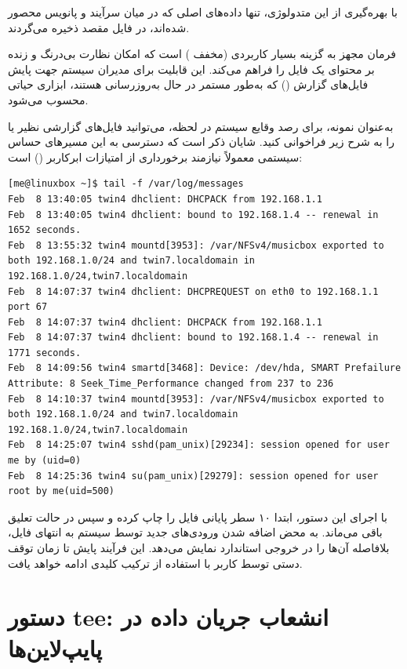 با بهره‌گیری از این متدولوژی، تنها داده‌های اصلی که در میان سرآیند و پانویس محصور شده‌اند، در فایل مقصد ذخیره می‌گردند.

فرمان  مجهز به گزینه بسیار کاربردی  (مخفف ) است که امکان نظارت بی‌درنگ و زنده بر محتوای یک فایل را فراهم می‌کند. این قابلیت برای مدیران سیستم جهت پایش فایل‌های گزارش () که به‌طور مستمر در حال به‌روزرسانی هستند، ابزاری حیاتی محسوب می‌شود.

به‌عنوان نمونه، برای رصد وقایع سیستم در لحظه، می‌توانید فایل‌های گزارشی نظیر  یا  را به شرح زیر فراخوانی کنید. شایان ذکر است که دسترسی به این مسیرهای حساس سیستمی معمولاً نیازمند برخورداری از امتیازات ابرکاربر () است:

\begin{latin}
\begin{lstlisting}
[me@linuxbox ~]$ tail -f /var/log/messages
Feb  8 13:40:05 twin4 dhclient: DHCPACK from 192.168.1.1
Feb  8 13:40:05 twin4 dhclient: bound to 192.168.1.4 -- renewal in
1652 seconds.
Feb  8 13:55:32 twin4 mountd[3953]: /var/NFSv4/musicbox exported to
both 192.168.1.0/24 and twin7.localdomain in
192.168.1.0/24,twin7.localdomain
Feb  8 14:07:37 twin4 dhclient: DHCPREQUEST on eth0 to 192.168.1.1
port 67
Feb  8 14:07:37 twin4 dhclient: DHCPACK from 192.168.1.1
Feb  8 14:07:37 twin4 dhclient: bound to 192.168.1.4 -- renewal in
1771 seconds.
Feb  8 14:09:56 twin4 smartd[3468]: Device: /dev/hda, SMART Prefailure Attribute: 8 Seek_Time_Performance changed from 237 to 236
Feb  8 14:10:37 twin4 mountd[3953]: /var/NFSv4/musicbox exported to both 192.168.1.0/24 and twin7.localdomain
192.168.1.0/24,twin7.localdomain
Feb  8 14:25:07 twin4 sshd(pam_unix)[29234]: session opened for user me by (uid=0)
Feb  8 14:25:36 twin4 su(pam_unix)[29279]: session opened for user root by me(uid=500)
\end{lstlisting}
\end{latin}

با اجرای این دستور،  ابتدا ۱۰ سطر پایانی فایل را چاپ کرده و سپس در حالت تعلیق باقی می‌ماند. به محض اضافه شدن ورودی‌های جدید توسط سیستم به انتهای فایل،  بلافاصله آن‌ها را در خروجی استاندارد نمایش می‌دهد. این فرآیند پایش تا زمان توقف دستی توسط کاربر با استفاده از ترکیب کلیدی  ادامه خواهد یافت.

\section{دستور tee: انشعاب جریان داده در پایپ‌لاین‌ها}

